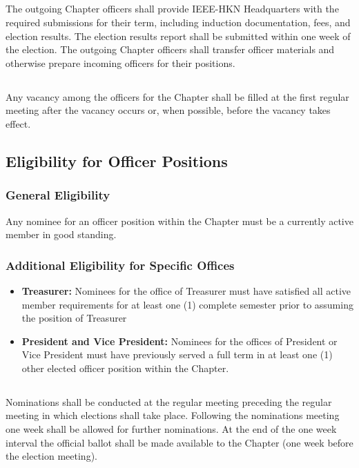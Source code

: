 \documentclass[10pt, oneside]{article}
\begin{document}
\subsection{}
The outgoing Chapter officers shall provide IEEE-HKN Headquarters with the required submissions for their term, including induction documentation, fees, and election results. The election results report shall be submitted within one week of the election. The outgoing Chapter officers shall transfer officer materials and otherwise prepare incoming officers for their positions.

\subsection{}
Any vacancy among the officers for the Chapter shall be filled at the first regular meeting after the vacancy occurs or, when possible, before the vacancy takes effect.

\subsection{Eligibility for Officer Positions}\label{OfficerReq}
\subsubsection{General Eligibility}
Any nominee for an officer position within the Chapter must be a currently active member in good standing.

\subsubsection{Additional Eligibility for Specific Offices}
\begin{itemize}
    \item \textbf{Treasurer:} Nominees for the office of Treasurer must have satisfied all active member requirements for at least one (1) complete semester prior to assuming the position of Treasurer
    \item \textbf{President and Vice President:} Nominees for the offices of President or Vice President must have previously served a full term in at least one (1) other elected officer position within the Chapter.
\end{itemize}

\subsection{}
Nominations shall be conducted at the regular meeting preceding the regular meeting in which elections shall take place. Following the nominations meeting one week shall be allowed for further nominations. At the end of the one week interval the official ballot shall be made available to the Chapter (one week before the election meeting).
\end{document}
